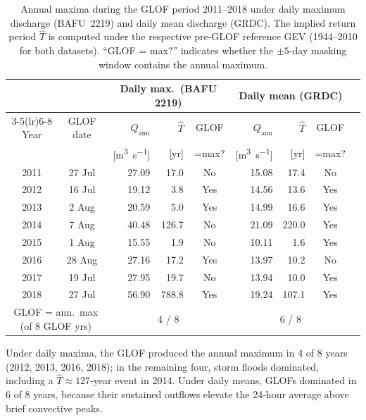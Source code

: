 \begin{table}[H]
  \centering
  \small
  \caption{Annual maxima during the GLOF period 2011--2018 under daily maximum discharge
           (BAFU~2219) and daily mean discharge (GRDC). The implied return period $\hat{T}$
           is computed under the respective pre-GLOF reference GEV (1944--2010 for both
           datasets). ``GLOF = max?'' indicates whether the $\pm 5$-day masking window
           contains the annual maximum.}
  \label{tab:glof_combined}
  \begin{tabular}{ccrrcrrcc}
    \toprule
    & & \multicolumn{3}{c}{Daily max.\ (BAFU 2219)} & \multicolumn{3}{c}{Daily mean (GRDC)} \\
    \cmidrule(lr){3-5}\cmidrule(lr){6-8}
    Year & GLOF date & $Q_\text{ann}$ & $\hat{T}$ & GLOF & $Q_\text{ann}$ & $\hat{T}$ & GLOF \\
         &           & [\si{m^3\per s}] & [yr] & =max? & [\si{m^3\per s}] & [yr] & =max? \\
    \midrule
    2011 & 27 Jul & 27.09 &   17.0 & No  & 15.08 &  17.4 & No  \\
    2012 & 16 Jul & 19.12 &    3.8 & Yes & 14.56 &  13.6 & Yes \\
    2013 &  2 Aug & 20.59 &    5.0 & Yes & 14.99 &  16.6 & Yes \\
    2014 &  7 Aug & 40.48 &  126.7 & No  & 21.09 & 220.0 & Yes \\
    2015 &  1 Aug & 15.55 &    1.9 & No  & 10.11 &   1.6 & Yes \\
    2016 & 28 Aug & 27.16 &   17.2 & Yes & 13.97 &  10.2 & No  \\
    2017 & 19 Jul & 27.95 &   19.7 & No  & 13.94 &  10.0 & Yes \\
    2018 & 27 Jul & 56.90 &  788.8 & Yes & 19.24 & 107.1 & Yes \\
    \midrule
    \multicolumn{2}{c}{GLOF = ann.\ max (of 8 GLOF yrs)} & \multicolumn{3}{c}{4 / 8} & \multicolumn{3}{c}{6 / 8} \\
    \bottomrule
  \end{tabular}
\end{table}

Under daily maxima, the GLOF produced the annual maximum in 4 of 8 years (2012, 2013,
2016, 2018); in the remaining four, storm floods dominated, including a
$\hat{T} \approx 127$-year event in 2014. Under daily means, GLOFs dominated in 6 of 8
years, because their sustained outflows elevate the 24-hour average above brief
convective peaks.

